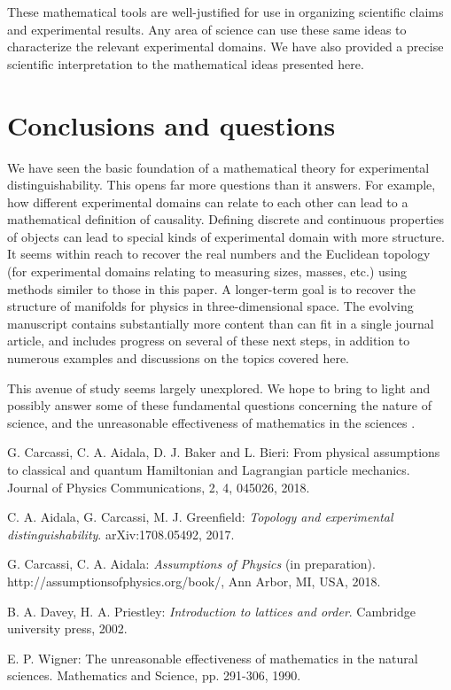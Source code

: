 \documentclass[psamsfonts]{amsart}
\theoremstyle{definition}
\theoremstyle{remark}
\numberwithin{equation}{section}
\begin{document}
These mathematical tools are well-justified for use in organizing scientific claims and experimental results. Any area of science can use these same ideas to characterize the relevant experimental domains. We have also provided a precise scientific interpretation to the mathematical ideas presented here. 

\section{Conclusions and questions}
\label{conclusion}

We have seen the basic foundation of a mathematical theory for experimental distinguishability. This opens far more questions than it answers. For example, how different experimental domains can relate to each other can lead to a mathematical definition of causality. Defining discrete and continuous properties of objects can lead to special kinds of experimental domain with more structure. It seems within reach to recover the real numbers and the Euclidean topology (for experimental domains relating to measuring sizes, masses, etc.) using methods similer to those in this paper. A longer-term goal is to recover the structure of manifolds for physics in three-dimensional space. The evolving manuscript \cite{carc3} contains substantially more content than can fit in a single journal article, and includes progress on several of these next steps, in addition to numerous examples and discussions on the topics covered here. 

This avenue of study seems largely unexplored. We hope to bring to light and possibly answer some of these fundamental questions concerning the nature of science, and the unreasonable effectiveness of mathematics in the sciences \cite{wigner}. 











\begin{thebibliography}{1}
	 G. Carcassi, C. A. Aidala, D. J. Baker and L. Bieri: From physical assumptions to classical and quantum Hamiltonian and Lagrangian particle mechanics. Journal of Physics Communications, 2, 4, 045026, 2018.

	 C. A. Aidala, G. Carcassi, M. J. Greenfield: \emph{Topology and experimental distinguishability}. arXiv:1708.05492, 2017.


	 G. Carcassi, C. A. Aidala: \emph{Assumptions of Physics} (in preparation). http://assumptionsofphysics.org/book/, Ann Arbor, MI, USA, 2018.


	 B. A. Davey, H. A. Priestley: \emph{Introduction to lattices and order}. Cambridge university press, 2002.

	 E. P. Wigner: The unreasonable effectiveness of mathematics in the natural sciences. Mathematics and Science, pp. 291-306, 1990.

\end{thebibliography}
\end{document}
